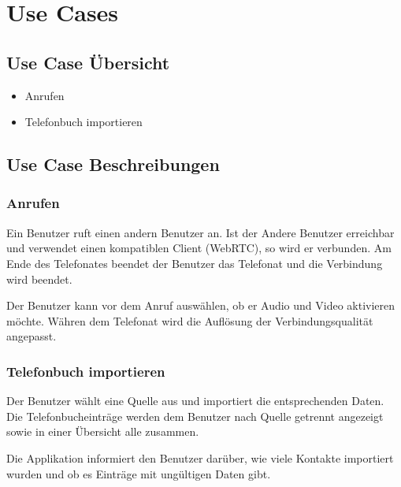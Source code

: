 \chapter{Use Cases}

\section{Use Case Übersicht}
\begin{itemize}
	\item Anrufen
	\item Telefonbuch importieren
\end{itemize}

\section{Use Case Beschreibungen}

\subsection{Anrufen}
Ein Benutzer ruft einen andern Benutzer an. Ist der Andere Benutzer erreichbar und verwendet einen kompatiblen Client (WebRTC), so wird er verbunden.
Am Ende des Telefonates beendet der Benutzer das Telefonat und die Verbindung wird beendet.

Der Benutzer kann vor dem Anruf auswählen, ob er Audio und Video aktivieren möchte. Währen dem Telefonat wird die Auflösung der Verbindungsqualität angepasst.

\subsection{Telefonbuch importieren}
Der Benutzer wählt eine Quelle aus und importiert die entsprechenden Daten. Die Telefonbucheinträge werden dem Benutzer nach Quelle getrennt angezeigt sowie in einer Übersicht alle zusammen.

Die Applikation informiert den Benutzer darüber, wie viele Kontakte importiert wurden und ob es Einträge mit ungültigen Daten gibt.
